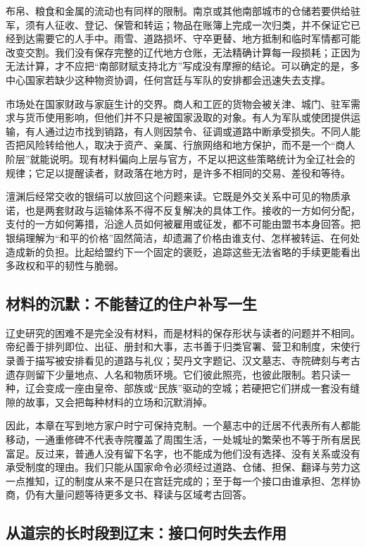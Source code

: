 布帛、粮食和金属的流动也有同样的限制。南京或其他南部城市的仓储若要供给驻军，须有人征收、登记、保管和转运；物品在账簿上完成一次归类，并不保证它已经到达需要它的人手中。雨雪、道路损坏、守卒更替、地方抵制和临时军情都可能改变交割。我们没有保存完整的辽代地方仓账，无法精确计算每一段损耗；正因为无法计算，才不应把“南部财赋支持北方”写成没有摩擦的结论。可以确定的是，多中心国家若缺少这种物资协调，任何宫廷与军队的安排都会迅速失去支撑。

市场处在国家财政与家庭生计的交界。商人和工匠的货物会被关津、城门、驻军需求与货币使用影响，但他们并不只是被国家汲取的对象。有人为军队或使团提供运输，有人通过边市找到销路，有人则因禁令、征调或道路中断承受损失。不同人能否把风险转给他人，取决于资产、亲属、行旅网络和地方保护，而不是一个“商人阶层”就能说明。现有材料偏向上层与官方，不足以把这些策略统计为全辽社会的规律；它足以提醒读者，财政落在地方时，是许多不相同的交易、差役和等待。

澶渊后经常交收的银绢可以放回这个问题来读。它既是外交关系中可见的物质承诺，也是两套财政与运输体系不得不反复解决的具体工作。接收的一方如何分配，支付的一方如何筹措，沿途人员如何被雇用或征发，都不可能由盟书本身回答。把银绢理解为“和平的价格”固然简洁，却遗漏了价格由谁支付、怎样被转运、在何处造成新的负担。比起给盟约下一个固定的褒贬，追踪这些无法省略的手续更能看出多政权和平的韧性与脆弱。

\subsection{材料的沉默：不能替辽的住户补写一生}

辽史研究的困难不是完全没有材料，而是材料的保存形状与读者的问题并不相同。帝纪善于排列即位、出征、册封和大事，志书善于归类官署、营卫和制度，宋使行录善于描写被安排看见的道路与礼仪；契丹文字题记、汉文墓志、寺院碑刻与考古遗存则留下少量地点、人名和物质环境。它们彼此照亮，也彼此限制。若只读一种，辽会变成一座由皇帝、部族或“民族”驱动的空城；若硬把它们拼成一套没有缝隙的故事，又会把每种材料的立场和沉默消掉。

因此，本章在写到地方家户时宁可保持克制。一个墓志中的迁居不代表所有人都能移动，一通重修碑不代表寺院覆盖了周围生活，一处城址的繁荣也不等于所有居民富足。反过来，普通人没有留下名字，也不能成为他们没有选择、没有关系或没有承受制度的理由。我们只能从国家命令必须经过道路、仓储、担保、翻译与劳力这一点推知，辽的制度从来不是只在宫廷完成的；至于每一个接口由谁承担、怎样协商，仍有大量问题等待更多文书、释读与区域考古回答。

\subsection{从道宗的长时段到辽末：接口何时失去作用}

